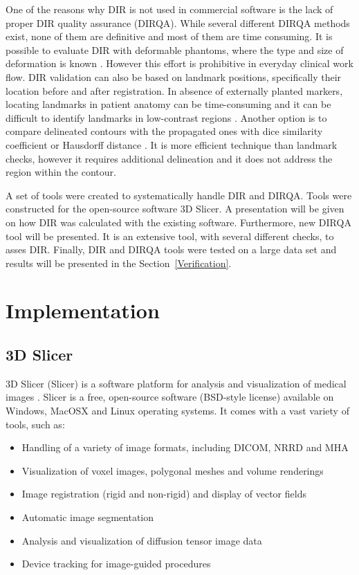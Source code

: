 One of the reasons why DIR is not used in commercial software is the lack of proper DIR quality assurance (DIRQA). While several different DIRQA methods exist, none of them are definitive and most of them are time consuming. 
It is possible to evaluate DIR with deformable phantoms, where the type and size of deformation is known \cite{Kashani2007, Kirby2011}. However this effort is prohibitive 
in everyday clinical work flow. DIR validation can also be based on landmark positions, specifically their location before and after registration. In absence of externally planted markers, locating landmarks in patient 
anatomy can be time-consuming and it can be difficult to identify landmarks in low-contrast regions \cite{Varadhan2013}. Another option is to compare delineated contours with the propagated ones with dice similarity coefficient \cite{Varadhan2013} or Hausdorff distance \cite{Huttenlocher1993}. 
It is more efficient technique than landmark checks, however it requires additional delineation and it does not address the region within the contour.

A set of tools were created to systematically handle DIR and DIRQA. Tools were constructed for the open-source software 3D Slicer. 
A presentation will be given on how DIR was calculated with the existing software. Furthermore, new DIRQA tool will be presented. It is an extensive tool,
with several different checks, to asses DIR. Finally, DIR and DIRQA tools were tested on a large data set and results will be presented in the Section~\ref{Verification}.

\section{Implementation}
\label{Implementation}

\subsection{3D Slicer}
\label{Slicer}

3D Slicer (Slicer) is a software platform for analysis and visualization of medical images \cite{Slicer, Fedorov2012}. Slicer is a free, open-source software (BSD-style license) available on Windows, MacOSX and Linux operating systems. 
It comes with a vast variety of tools, such as:

\begin{itemize}
	\item Handling of a variety of image formats, including DICOM, NRRD and MHA
	\item Visualization of voxel images, polygonal meshes and volume renderings
	\item Image registration (rigid and non-rigid) and display of vector fields
	\item Automatic image segmentation
	\item Analysis and visualization of diffusion tensor image data
	\item Device tracking for image-guided procedures
\end{itemize}


